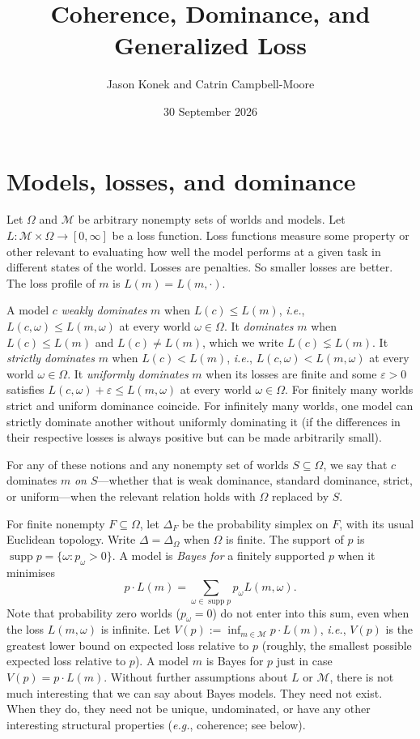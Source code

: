 \documentclass[11pt]{article}
\title{Coherence, Dominance, and Generalized Loss}
\author{Jason Konek and Catrin Campbell-Moore}
\date{30 September 2026}
\theoremstyle{definition}
\theoremstyle{remark}
\newcommand{\M}{\mathcal M}
\newcommand{\supp}{\operatorname{supp}}
\begin{document}
\maketitle


\section{Models, losses, and dominance}\label{sec:setting}
Let $\Omega$ and $\M$ be arbitrary nonempty sets of worlds and models. Let $L:\M\times\Omega\to[0,\infty]$ be a loss function. Loss functions measure some property or other relevant to evaluating how well the model performs at a given task in different states of the world. Losses are penalties. So smaller losses are better. The loss profile of $m$ is $L(m)=L(m,\cdot)$. 

A model $c$ \emph{weakly dominates} $m$ when $L(c)\le L(m)$, \textit{i.e.}, $L(c,\omega)\le L(m,\omega)$ at every world $\omega\in\Omega$. It \emph{dominates} $m$ when $L(c)\le L(m)$ and $L(c)\neq L(m)$, which we write $L(c)\lneq L(m)$. It \emph{strictly dominates} $m$ when $L(c)< L(m)$, \textit{i.e.}, $L(c,\omega)< L(m,\omega)$ at every world $\omega\in\Omega$. It \emph{uniformly dominates} $m$ when its losses are finite and some $\varepsilon>0$ satisfies $L(c,\omega)+\varepsilon\le L(m,\omega)$ at every world $\omega\in\Omega$. For finitely many worlds strict and uniform dominance coincide. For infinitely many worlds, one model can strictly dominate another without uniformly dominating it (if the differences in their respective losses is always positive but can be made arbitrarily small).

For any of these notions and any nonempty set of worlds $S\subseteq\Omega$, we say that $c$ dominates $m$ \emph{on $S$}---whether that is weak dominance, standard dominance, strict, or uniform---when the relevant relation holds with $\Omega$ replaced by $S$.

For finite nonempty $F\subseteq\Omega$, let $\Delta_F$ be the probability simplex on $F$, with its usual Euclidean topology. Write $\Delta=\Delta_\Omega$ when $\Omega$ is finite. The support of $p$ is $\supp p=\{\omega:p_\omega>0\}$. A model is \emph{Bayes for} a finitely supported $p$ when it minimises
\[
 p\cdot L(m)=\sum_{\omega\in\supp p}p_\omega L(m,\omega).
\]
Note that probability zero worlds ($p_\omega=0$) do not enter into this sum, even when the loss $L(m,\omega)$ is infinite. Let $V(p):=\inf_{m\in\M}p\cdot L(m)$, \textit{i.e.}, $V(p)$ is the greatest lower bound on expected loss relative to $p$ (roughly, the smallest possible expected loss relative to $p$). A model $m$ is Bayes for $p$ just in case $V(p)=p\cdot L(m)$. Without further assumptions about $L$ or $\M$, there is not much interesting that we can say about Bayes models. They need not exist. When they do, they need not be unique, undominated, or have any other interesting structural properties (\textit{e.g.}, coherence; see below).
\end{document}
